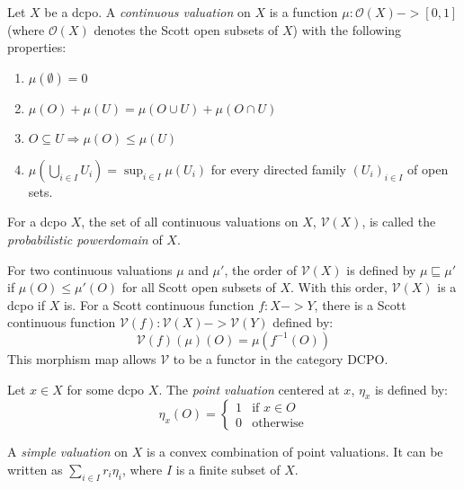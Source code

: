 \begin{definition}
Let $X$ be a dcpo.  A \emph{continuous valuation} on $X$ is a function $\mu:\mathcal{O}(X)->[0,1]$ (where $\mathcal{O}(X)$ denotes the Scott open subsets of $X$) with the following properties:
\begin{enumerate}
\item $\mu(\emptyset) = 0$
\item $\mu(O) + \mu(U) = \mu(O\cup U) + \mu(O\cap U)$
\item $O\subseteq U \Rightarrow \mu(O) \leq \mu(U)$
\item $\mu(\bigcup_{i\in I} U_i) = \sup_{i\in I} \mu(U_i)$ for every directed family $(U_i)_{i\in I}$ of open sets.
\end{enumerate}
\end{definition}
\begin{definition}
For a dcpo $X$, the set of all continuous valuations on $X$, $\mathcal{V}(X)$, is called the \emph{probabilistic powerdomain} of $X$.  
\end{definition}
For two continuous valuations $\mu$ and $\mu'$, the order of $\mathcal{V}(X)$ is defined by $\mu\sqsubseteq\mu'$ if ${\mu(O) \leq \mu'(O)}$ for all Scott open subsets of $X$.  With this order, $\mathcal{V}(X)$ is a dcpo if $X$ is.  For a Scott continuous function $f:X->Y$, there is a Scott continuous function $\mathcal{V}(f):\mathcal{V}(X)->\mathcal{V}(Y)$ defined by:
\[\mathcal{V}(f)(\mu)(O) = \mu(f^{-1}(O))\]
This morphism map allows $\mathcal{V}$ to be a functor in the category \textsf{DCPO}.

\begin{definition}
Let $x\in X$ for some dcpo $X$.  The \emph{point valuation} centered at $x$, $\eta_x$ is defined by:
\[
	\eta_x(O) = \begin{cases}
		1 & \text{if } x\in O \\
		0 & \text{otherwise}
	\end{cases}
\]
\end{definition}

\begin{definition}
A \emph{simple valuation} on $X$ is a convex combination of point valuations.  It can be written as $\sum_{i\in I} r_i\eta_i$, where $I$ is a finite subset of $X$.
\end{definition}

